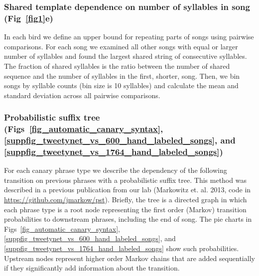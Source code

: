 \documentclass[10pt,letterpaper]{article}
\begin{document}
\subsubsection*{Shared template dependence on number of syllables in song (Fig~\ref{fig1}e)}
In each bird we define an upper bound for repeating parts of songs using pairwise comparisons. For each song we examined all other songs with equal or larger number of syllables and found the largest shared string of consecutive syllables. The fraction of shared syllables is the ratio between the number of shared sequence and the number of syllables in the first, shorter, song. Then, we bin songs by syllable counts (bin size is 10 syllables) and calculate the mean and standard deviation across all pairwise comparisons.
\subsubsection*{Probabilistic suffix tree (Figs~\ref{fig_automatic_canary_syntax},\ref{suppfig_tweetynet_vs_600_hand_labeled_songs}, and \ref{suppfig_tweetynet_vs_1764_hand_labeled_songs})}
For each canary phrase type we describe the dependency of the following transition on previous phrases with a probabilistic suffix tree. This method was described in a previous publication from our lab (Markowitz et. al. 2013, code in \url{https://github.com/jmarkow/pst}). Briefly, the tree is a directed graph in which each phrase type is a root node representing the first order (Markov) transition probabilities to downstream phrases, including the end of song. The pie charts in Figs~\ref{fig_automatic_canary_syntax},\ref{suppfig_tweetynet_vs_600_hand_labeled_songs}, and \ref{suppfig_tweetynet_vs_1764_hand_labeled_songs} show such probabilities. Upstream nodes represent higher order Markov chains that are added sequentially if they significantly add information about the transition.
\end{document}
